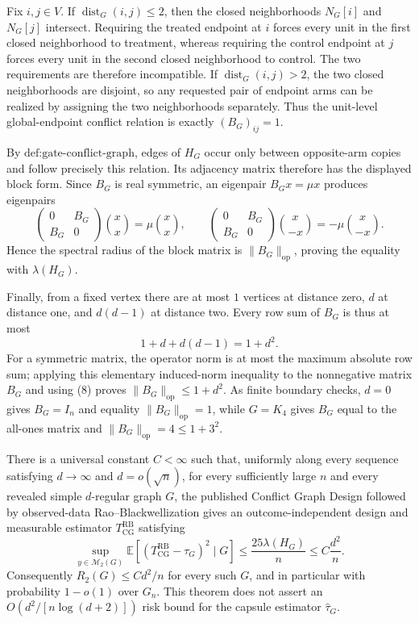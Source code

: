 Fix \(i,j\in V\).  If \(\operatorname{dist}_G(i,j)\le2\), then the closed neighborhoods \(N_G[i]\) and \(N_G[j]\) intersect.  Requiring the treated endpoint at \(i\) forces every unit in the first closed neighborhood to treatment, whereas requiring the control endpoint at \(j\) forces every unit in the second closed neighborhood to control.  The two requirements are therefore incompatible.  If \(\operatorname{dist}_G(i,j)>2\), the two closed neighborhoods are disjoint, so any requested pair of endpoint arms can be realized by assigning the two neighborhoods separately.  Thus the unit-level global-endpoint conflict relation is exactly \((B_G)_{ij}=1\).

By \(\text{def:gate-conflict-graph}\), edges of \(H_G\) occur only between opposite-arm copies and follow precisely this relation.  Its adjacency matrix therefore has the displayed block form.  Since \(B_G\) is real symmetric, an eigenpair \(B_Gx=\mu x\) produces eigenpairs
\[
\begin{pmatrix}0&B_G\\B_G&0\end{pmatrix}
\binom{x}{x}=\mu\binom{x}{x},
\qquad
\begin{pmatrix}0&B_G\\B_G&0\end{pmatrix}
\binom{x}{-x}=-\mu\binom{x}{-x}.
\]
Hence the spectral radius of the block matrix is \(\|B_G\|_{\mathrm{op}}\), proving the equality with \(\lambda(H_G)\).

Finally, from a fixed vertex there are at most \(1\) vertices at distance zero, \(d\) at distance one, and \(d(d-1)\) at distance two.  Every row sum of \(B_G\) is thus at most
\[
1+d+d(d-1)=1+d^2. \tag{8}
\]
For a symmetric matrix, the operator norm is at most the maximum absolute row sum; applying this elementary induced-norm inequality to the nonnegative matrix \(B_G\) and using (8) proves \(\|B_G\|_{\mathrm{op}}\le1+d^2\).  As finite boundary checks, \(d=0\) gives \(B_G=I_n\) and equality \(\|B_G\|_{\mathrm{op}}=1\), while \(G=K_4\) gives \(B_G\) equal to the all-ones matrix and \(\|B_G\|_{\mathrm{op}}=4\le1+3^2\).

There is a universal constant \(C<\infty\) such that, uniformly along every sequence satisfying \(d\to\infty\) and \(d=o(\sqrt n)\), for every sufficiently large \(n\) and every revealed simple \(d\)-regular graph \(G\), the published Conflict Graph Design followed by observed-data Rao--Blackwellization gives an outcome-independent design and measurable estimator \(T_{\mathrm{CG}}^{\mathrm{RB}}\) satisfying
\[
\sup_{y\in\mathcal M_2(G)}
\mathbb E\!\left[(T_{\mathrm{CG}}^{\mathrm{RB}}-\tau_G)^2\mid G\right]
\le \frac{25\lambda(H_G)}{n}
\le C\frac{d^2}{n}.
\]
Consequently \(R_2(G)\le C d^2/n\) for every such \(G\), and in particular with probability \(1-o(1)\) over \(G_n\).  This theorem does not assert an \(O(d^2/[n\log(d+2)])\) risk bound for the capsule estimator \(\widehat\tau_G\).

